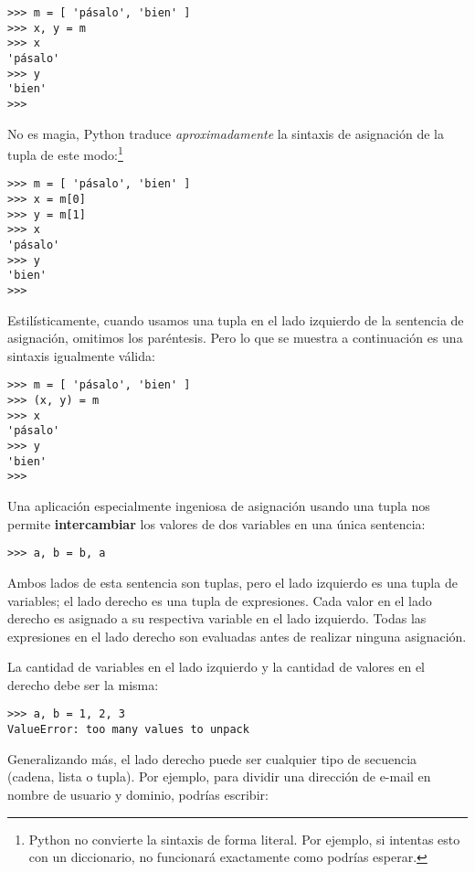\beforeverb
\begin{verbatim}
>>> m = [ 'pásalo', 'bien' ]
>>> x, y = m
>>> x
'pásalo'
>>> y
'bien'
>>> 
\end{verbatim}
\afterverb
%
No es magia, Python traduce \emph{aproximadamente} la
sintaxis de asignación de la tupla
de este modo:\footnote{Python no convierte la
sintaxis de forma literal. Por ejemplo, si intentas esto con un diccionario,
no funcionará exactamente como podrías esperar.}

\beforeverb
\begin{verbatim}
>>> m = [ 'pásalo', 'bien' ]
>>> x = m[0]
>>> y = m[1]
>>> x
'pásalo'
>>> y
'bien'
>>> 
\end{verbatim}
\afterverb

Estilísticamente, cuando usamos una tupla en el lado izquierdo de la sentencia
de asignación, omitimos los paréntesis. Pero lo que se muestra a continuación
es una sintaxis igualmente válida:

\beforeverb
\begin{verbatim}
>>> m = [ 'pásalo', 'bien' ]
>>> (x, y) = m
>>> x
'pásalo'
>>> y
'bien'
>>> 
\end{verbatim}
\afterverb
%
Una aplicación especialmente ingeniosa de asignación usando una tupla nos
permite {\bf intercambiar} los valores de dos variables en una única sentencia:

\beforeverb
\begin{verbatim}
>>> a, b = b, a
\end{verbatim}
\afterverb
%
Ambos lados de esta sentencia son tuplas, pero
el lado izquierdo es una tupla de variables; el lado derecho es una tupla
de expresiones. Cada valor en el lado derecho
es asignado a su respectiva variable en el lado izquierdo.
Todas las expresiones en el lado derecho son evaluadas antes de
realizar ninguna asignación.

La cantidad de variables en el lado izquierdo y la cantidad de
valores en el derecho debe ser la misma:


\beforeverb
\begin{verbatim}
>>> a, b = 1, 2, 3
ValueError: too many values to unpack
\end{verbatim}
\afterverb
%
Generalizando más, el lado derecho puede ser cualquier tipo de secuencia
(cadena, lista o tupla). Por ejemplo, para dividir una dirección de e-mail
en nombre de usuario y dominio, podrías escribir:

